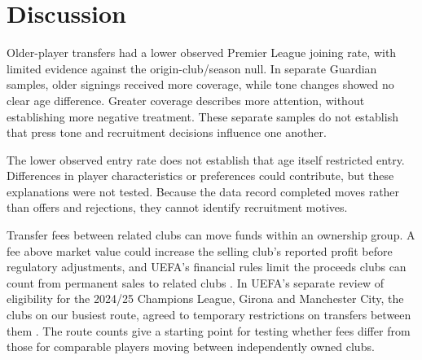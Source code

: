 \section*{Discussion}

Older-player transfers had a lower observed Premier League joining rate, with limited evidence against the origin-club/season null. In separate Guardian samples, older signings received more coverage, while tone changes showed no clear age difference. Greater coverage describes more attention, without establishing more negative treatment. These separate samples do not establish that press tone and recruitment decisions influence one another.

The lower observed entry rate does not establish that age itself restricted entry. Differences in player characteristics or preferences could contribute, but these explanations were not tested. Because the data record completed moves rather than offers and rejections, they cannot identify recruitment motives.

Transfer fees between related clubs can move funds within an ownership group. A fee above market value could increase the selling club's reported profit before regulatory adjustments, and UEFA's financial rules limit the proceeds clubs can count from permanent sales to related clubs \cite{uefa2024financialsustainability}. In UEFA's separate review of eligibility for the 2024/25 Champions League, Girona and Manchester City, the clubs on our busiest route, agreed to temporary restrictions on transfers between them \cite{uefa2024multiclubownership}. The route counts give a starting point for testing whether fees differ from those for comparable players moving between independently owned clubs.

